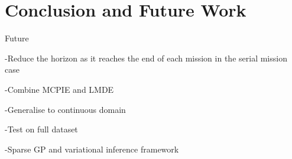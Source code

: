 \chapter{Conclusion and Future Work}
\label{Conclusion}

	Future
	
	-Reduce the horizon as it reaches the end of each mission in the serial mission case
	
	-Combine MCPIE and LMDE
	
	-Generalise to continuous domain
	
	-Test on full dataset
	
	-Sparse GP and variational inference framework
	

	